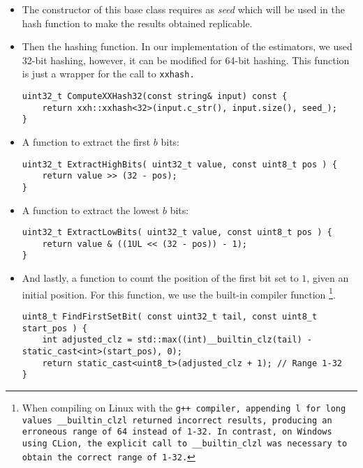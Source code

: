 \documentclass[a4paper, 11pt]{article}
\begin{document}
\begin{itemize}
    \item The constructor of this base class requires as \textit{seed} which will be used in the hash function to make the results obtained replicable.
    \item Then the hashing function. In our implementation of the estimators, we used 32-bit hashing, however, it can be modified for 64-bit hashing. This function is just a wrapper for the call to \tt{xxhash}.
        \begin{lstlisting}[style=c++style]
uint32_t ComputeXXHash32(const string& input) const {
    return xxh::xxhash<32>(input.c_str(), input.size(), seed_);
}\end{lstlisting}\vspace*{-2em}
    
    \item A function to extract the first $b$ bits:
    \begin{lstlisting}[style=c++style]
uint32_t ExtractHighBits( uint32_t value, const uint8_t pos ) {
    return value >> (32 - pos);
}\end{lstlisting}
    
    \vspace*{-2em}
    \item A function to extract the lowest $b$ bits:
    \begin{lstlisting}[style=c++style]
uint32_t ExtractLowBits( uint32_t value, const uint8_t pos ) {
    return value & ((1UL << (32 - pos)) - 1);
}\end{lstlisting}\vspace*{-2em}

    \item And lastly, a function to count the position of the first bit set to $1$, given an initial position. For this function, we use the built-in compiler function \footnote{When compiling on Linux with the \tt{g++} compiler, appending \tt{l} for long values \tt{\_\_builtin\_clzl} returned incorrect results, producing an erroneous range of 64 instead of 1-32. In contrast, on Windows using CLion, the explicit call to \tt{\_\_builtin\_clzl} was necessary to obtain the correct range of 1-32.}.
        \begin{lstlisting}[style=c++style]
uint8_t FindFirstSetBit( const uint32_t tail, const uint8_t start_pos ) {
    int adjusted_clz = std::max((int)__builtin_clz(tail) - static_cast<int>(start_pos), 0);
    return static_cast<uint8_t>(adjusted_clz + 1); // Range 1-32
}\end{lstlisting}

\end{itemize}
\end{document}
